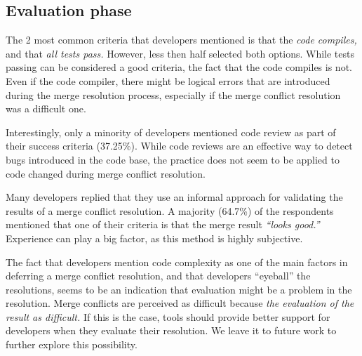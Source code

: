 
\subsection{Evaluation phase}

The 2 most common criteria that developers mentioned is that the \emph{code compiles,} and that \emph{all tests pass.}
However, less then half selected both options.
While tests passing can be considered a good criteria, the fact that the code compiles is not.
Even if the code compiler, there might be logical errors that are introduced during the merge resolution process, especially if the merge conflict resolution was a difficult one.

Interestingly, only a minority of developers mentioned code review as part of their success criteria (37.25\%).
While code reviews are an effective way to detect bugs introduced in the code base, the practice does not seem to be applied to code changed during merge conflict resolution.

Many developers replied that they use an informal approach for validating the results of a merge conflict resolution.
A majority (64.7\%) of the respondents mentioned that one of their criteria is that the merge result \emph{``looks good.''}
Experience can play a big factor, as this method is highly subjective.

The fact that developers mention code complexity as one of the main factors in deferring a merge conflict resolution, and that developers ``eyeball'' the resolutions, seems to be an indication that evaluation might be a problem in the resolution.
Merge conflicts are perceived as difficult because \emph{the evaluation of the result as difficult.}
If this is the case, tools should provide better support for developers when they evaluate their resolution.
We leave it to future work to further explore this possibility. 

